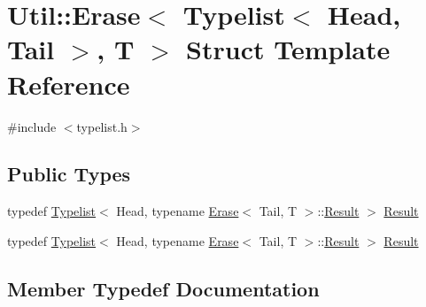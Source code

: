\hypertarget{structUtil_1_1TL_1_1Erase_3_01Typelist_3_01Head_00_01Tail_01_4_00_01T_01_4}{}\section{Util\+:\+:Erase$<$ Typelist$<$ Head, Tail $>$, T $>$ Struct Template Reference}
\label{structUtil_1_1TL_1_1Erase_3_01Typelist_3_01Head_00_01Tail_01_4_00_01T_01_4}


{\ttfamily \#include $<$typelist.\+h$>$}

\subsection*{Public Types}
\begin{DoxyCompactItemize}
\item 
typedef \mbox{\hyperlink{structUtil_1_1Typelist}{Typelist}}$<$ Head, typename \mbox{\hyperlink{structUtil_1_1TL_1_1Erase}{Erase}}$<$ Tail, T $>$\+::\mbox{\hyperlink{structUtil_1_1TL_1_1Erase_3_01Typelist_3_01Head_00_01Tail_01_4_00_01T_01_4_a68b3e32a3703ec33f196f25e84e3841e}{Result}} $>$ \mbox{\hyperlink{structUtil_1_1TL_1_1Erase_3_01Typelist_3_01Head_00_01Tail_01_4_00_01T_01_4_a68b3e32a3703ec33f196f25e84e3841e}{Result}}
\item 
typedef \mbox{\hyperlink{structUtil_1_1Typelist}{Typelist}}$<$ Head, typename \mbox{\hyperlink{structUtil_1_1TL_1_1Erase}{Erase}}$<$ Tail, T $>$\+::\mbox{\hyperlink{structUtil_1_1TL_1_1Erase_3_01Typelist_3_01Head_00_01Tail_01_4_00_01T_01_4_a68b3e32a3703ec33f196f25e84e3841e}{Result}} $>$ \mbox{\hyperlink{structUtil_1_1TL_1_1Erase_3_01Typelist_3_01Head_00_01Tail_01_4_00_01T_01_4_a68b3e32a3703ec33f196f25e84e3841e}{Result}}
\end{DoxyCompactItemize}


\subsection{Member Typedef Documentation}
\mbox{\label{structUtil_1_1TL_1_1Erase_3_01Typelist_3_01Head_00_01Tail_01_4_00_01T_01_4_a68b3e32a3703ec33f196f25e84e3841e}} 
